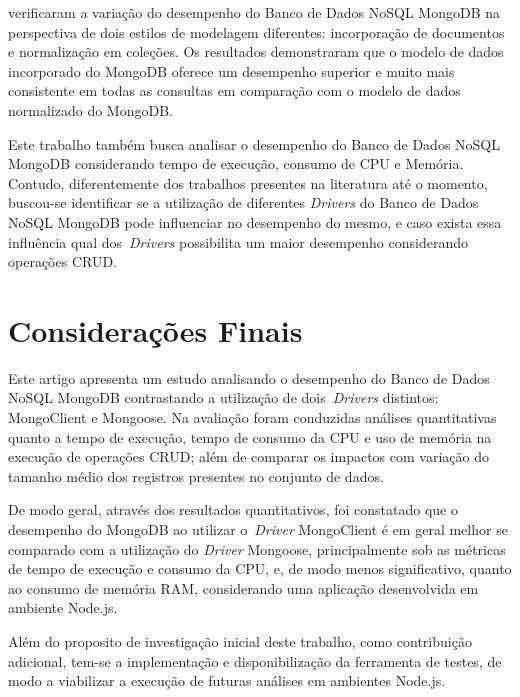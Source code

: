 \documentclass[12pt]{article}
\begin{document}
\cite{kanade2014study} verificaram a variação do desempenho do Banco de Dados NoSQL MongoDB na perspectiva de dois estilos de modelagem diferentes: incorporação de documentos e normalização em coleções. Os resultados demonstraram que o modelo de dados incorporado do MongoDB oferece um desempenho superior e muito mais consistente em todas as consultas em comparação com o modelo de dados normalizado do MongoDB.

Este trabalho também busca analisar o desempenho do Banco de Dados NoSQL MongoDB considerando tempo de execução, consumo de CPU e Memória. Contudo, diferentemente dos trabalhos presentes na literatura até o momento, buscou-se identificar se a utilização de diferentes \emph{Drivers} do Banco de Dados NoSQL MongoDB pode influenciar no desempenho do mesmo, e caso exista essa influência qual dos~\emph{Drivers} possibilita um maior desempenho considerando operações CRUD.

\section{Considerações Finais}
\label{section:consideracoes}

Este artigo apresenta um estudo analisando o desempenho do Banco de Dados NoSQL MongoDB contrastando a utilização de dois~\emph{Drivers} distintos: MongoClient e Mongoose.
Na avaliação foram conduzidas análises quantitativas quanto a tempo de execução, tempo de consumo da CPU e uso de memória na execução de operações CRUD; além de comparar os impactos com variação do tamanho médio dos registros presentes no conjunto de dados.

De modo geral, através dos resultados quantitativos, foi constatado que o desempenho do MongoDB ao utilizar o~\emph{Driver} MongoClient é em geral melhor se comparado com a utilização do \emph{Driver} Mongoose, principalmente sob as métricas de tempo de execução e consumo da CPU, e, de modo menos significativo, quanto ao consumo de memória RAM, considerando uma aplicação desenvolvida em ambiente Node.js.

Além do proposito de investigação inicial deste trabalho, como contribuição adicional, tem-se a implementação e disponibilização da ferramenta de testes, de modo a viabilizar a execução de futuras análises em ambientes Node.js.




\end{document}
